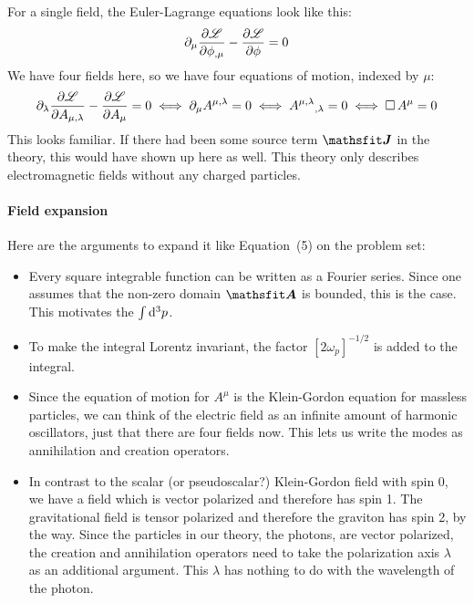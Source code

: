 \documentclass[11pt, english, fleqn, DIV=15, headinclude, BCOR=1cm]{scrartcl}
\begin{document}
For a single field, the Euler-Lagrange equations look like this:
\[
    \partial_\mu \frac{\partial {\mathscr L}}{\partial {\phi_{,\mu}}} - \frac{\partial {\mathscr L}}{\partial {\phi}} = 0
\]
We have four fields here, so we have four equations of motion, indexed by
$\mu$:
\[
    \partial_\lambda \frac{\partial {\mathscr L}}{\partial {A_{\mu,\lambda}}} - \frac{\partial {\mathscr L}}{\partial {A_\mu}}
    = 0
    \iff
    \partial_\mu A^{\mu,\lambda} = 0
    \iff
    A^{\mu,\lambda}{}_{,\lambda} = 0
    \iff
    \operatorname{\Box} A^\mu = 0
\]
This looks familiar. If there had been some source term $\tens J$ in the
theory, this would have shown up here as well. This theory only describes
electromagnetic fields without any charged particles.

\paragraph{Field expansion}

Here are the arguments to expand it like Equation~(5) on the problem set:

\begin{itemize}
    \item
        Every square integrable function can be written as a Fourier series.
        Since one assumes that the non-zero domain $\tens A$ is bounded, this
        is the case. This motivates the $\int \mathop{}\!\mathrm d^3 p$.

    \item
        To make the integral Lorentz invariant, the factor $[2
        \omega_p]^{-1/2}$ is added to the integral.

    \item
        Since the equation of motion for $A^\mu$ is the Klein-Gordon equation
        for massless particles, we can think of the electric field as an
        infinite amount of harmonic oscillators, just that there are four
        fields now. This lets us write the modes as annihilation and creation
        operators.

    \item
        In contrast to the scalar (or pseudoscalar?) Klein-Gordon field with
        spin 0, we have a field which is vector polarized and therefore has
        spin 1. The gravitational field is tensor polarized and therefore the
        graviton has spin 2, by the way. Since the particles in our theory, the
        photons, are vector polarized, the creation and annihilation operators
        need to take the polarization axis $\lambda$ as an additional argument.
        This $\lambda$ has nothing to do with the wavelength of the photon.
\end{itemize}
\end{document}
